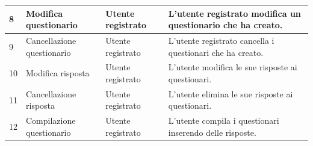\documentclass[12pt]{article}
\begin{document}
\begin{table}[H]
\begin{adjustbox}{max width=1.1\textwidth,center}
\begin{tabular}{llll}
\multicolumn{1}{|l|}{8}                                                          & \multicolumn{1}{l|}{Modifica questionario}                                                                    & \multicolumn{1}{l|}{Utente registrato}                                                                 & \multicolumn{1}{l|}{L'utente registrato modifica un questionario che ha creato.}                                                                                                                       \\ \hline
\multicolumn{1}{|l|}{9}                                                          & \multicolumn{1}{l|}{Cancellazione questionario}                                                               & \multicolumn{1}{l|}{Utente registrato}                                                                 & \multicolumn{1}{l|}{L'utente registrato cancella i questionari che ha creato.}                                                                                                                         \\ \hline
\multicolumn{1}{|l|}{10}                                                         & \multicolumn{1}{l|}{Modifica risposta}                                                                        & \multicolumn{1}{l|}{Utente registrato}                                                                 & \multicolumn{1}{l|}{L'utente modifica le sue risposte ai questionari.}                                                                                                                                 \\ \hline
\multicolumn{1}{|l|}{11}                                                         & \multicolumn{1}{l|}{Cancellazione risposta}                                                                   & \multicolumn{1}{l|}{Utente registrato}                                                                 & \multicolumn{1}{l|}{L'utente elimina le sue risposte ai questionari.}                                                                                                                                  \\ \hline
\multicolumn{1}{|l|}{12}                                                         & \multicolumn{1}{l|}{Compilazione questionario}                                                                & \multicolumn{1}{l|}{Utente registrato}                                                                 & \multicolumn{1}{l|}{L'utente compila i questionari inserendo delle risposte.}                                                                                                                          \\ \hline

\end{tabular}
\end{adjustbox}
\end{table}
\end{document}
